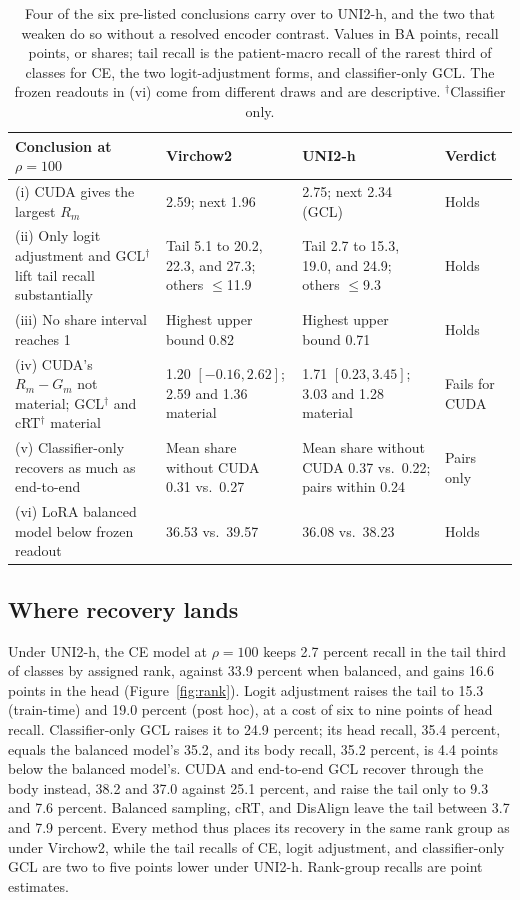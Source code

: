 \begin{table}[t]
\centering
\small
\renewcommand{\arraystretch}{1.15}
\begin{tabularx}{\textwidth}{@{}>{\raggedright\arraybackslash}p{}YY>{\raggedright\arraybackslash}p{0.12\textwidth}@{}}
\toprule
Conclusion at $\rho=100$ & Virchow2 & UNI2-h & Verdict \\
\midrule
(i) CUDA gives the largest $R_m$ & 2.59; next 1.96 & 2.75; next 2.34 (GCL) & Holds \\
(ii) Only logit adjustment and GCL$^{\dagger}$ lift tail recall substantially & Tail 5.1 to 20.2, 22.3, and 27.3; others $\leq$11.9 & Tail 2.7 to 15.3, 19.0, and 24.9; others $\leq$9.3 & Holds \\
(iii) No share interval reaches 1 & Highest upper bound 0.82 & Highest upper bound 0.71 & Holds \\
(iv) CUDA's $R_m-G_m$ not material; GCL$^{\dagger}$ and cRT$^{\dagger}$ material & 1.20 $[-0.16, 2.62]$; 2.59 and 1.36 material & 1.71 $[0.23, 3.45]$; 3.03 and 1.28 material & Fails for CUDA \\
(v) Classifier-only recovers as much as end-to-end & Mean share without CUDA 0.31 vs.\ 0.27 & Mean share without CUDA 0.37 vs.\ 0.22; pairs within 0.24 & Pairs only \\
(vi) LoRA balanced model below frozen readout & 36.53 vs.\ 39.57 & 36.08 vs.\ 38.23 & Holds \\
\bottomrule
\end{tabularx}
\caption{Four of the six pre-listed conclusions carry over to UNI2-h, and the two that weaken do so without a resolved encoder contrast. Values in BA points, recall points, or shares; tail recall is the patient-macro recall of the rarest third of classes for CE, the two logit-adjustment forms, and classifier-only GCL. The frozen readouts in (vi) come from different draws and are descriptive. $^{\dagger}$Classifier only.}
\label{tab:claims}
\end{table}

\subsection{Where recovery lands}
\label{sec:rank}
Under UNI2-h, the CE model at $\rho=100$ keeps 2.7 percent recall in the tail third of classes by assigned rank, against 33.9 percent when balanced, and gains 16.6 points in the head (Figure~\ref{fig:rank}). Logit adjustment raises the tail to 15.3 (train-time) and 19.0 percent (post hoc), at a cost of six to nine points of head recall. Classifier-only GCL raises it to 24.9 percent; its head recall, 35.4 percent, equals the balanced model's 35.2, and its body recall, 35.2 percent, is 4.4 points below the balanced model's. CUDA and end-to-end GCL recover through the body instead, 38.2 and 37.0 against 25.1 percent, and raise the tail only to 9.3 and 7.6 percent. Balanced sampling, cRT, and DisAlign leave the tail between 3.7 and 7.9 percent. Every method thus places its recovery in the same rank group as under Virchow2, while the tail recalls of CE, logit adjustment, and classifier-only GCL are two to five points lower under UNI2-h. Rank-group recalls are point estimates.

